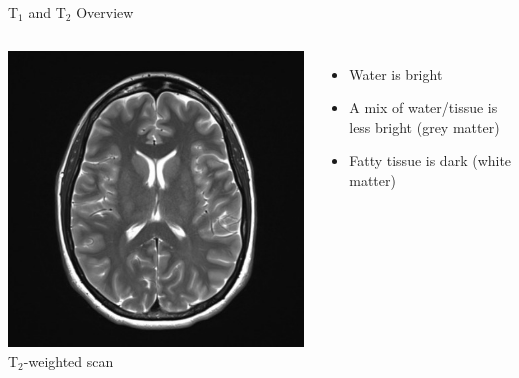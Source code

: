 \documentclass[aspectratio=169,xcolor=dvipsnames]{beamer}
\begin{document}
\begin{frame}{T$_{1}$ and T$_{2}$ Overview}
\begin{columns}[c]
\includegraphics[width=1\textwidth]{imgs/t2brain}
T$_{2}$-weighted scan
\begin{itemize}
\item Water is bright
\item A mix of water/tissue is less bright (grey matter)
\item Fatty tissue is dark (white matter)
\end{itemize}
\end{columns}

\end{frame}

\end{document}
